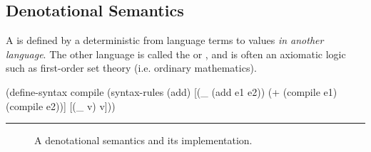 \subsection{Denotational Semantics}

A  is defined by a deterministic  from language terms to values \emph{in another language}.
The other language is called the  or , and is often an axiomatic logic such as first-order set theory (i.e. ordinary mathematics).

\newsavebox{\compileonebox}

\begin{lrbox}{\compileonebox}
\begin{varwidth}[b]{3.3in}
\singlespacing\centering
\begin{schemedisplay}
(define-syntax compile
  (syntax-rules (add)
    [(_ (add e1 e2))  (+ (compile e1)
                         (compile e2))]
    [(_ v)  v]))
\end{schemedisplay}
\hrule
\end{varwidth}
\end{lrbox}

\begin{figure}[tb]\centering
{}
\tab\tab
{}
\caption[Denotational semantics and implementation]{A denotational semantics and its implementation.}
\label{fig:add-denotational}
\end{figure}


